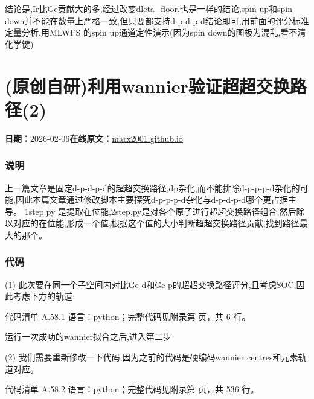 \documentclass[lang=cn,scheme=chinese,color=blue,device=normal,toc=onecol,math=cm]{elegantbook}
\begin{document}
结论是,Ir比Ge贡献大的多,经过改变dleta\_\allowbreak{}floor,也是一样的结论,spin up和spin down并不能在数量上严格一致,但只要都支持d-p-d-p-d结论即可,用前面的评分标准定量分析,用MLWFS 的spin up通道定性演示(因为spin down的图极为混乱,看不清化学键)\par



\section{(原创自研)利用wannier验证超超交换路径(2)}
\begin{articlemeta}
\textbf{日期：}2026-02-06\hfill\textbf{在线原文：}\href{https://marx2001.github.io/sci-note\_posts/20260206-super2}{marx2001.github.io}
\end{articlemeta}

\subsubsection{说明}


上一篇文章是固定d-p-d-p-d的超超交换路径,dp杂化,而不能排除d-p-p-p-d杂化的可能,因此本篇文章通过修改脚本主要探究d-p-p-p-d杂化与d-p-d-p-d哪个更占据主导。 1step.py 是提取在位能,2step.py是对各个原子进行超超交换路径组合,然后除以对应的在位能,形成一个值,根据这个值的大小判断超超交换路径贡献,找到路径最大的那个。\par


\subsubsection{代码}


(1) 此次要在同一个子空间内对比Ge-d和Ge-p的超超交换路径评分,且考虑SOC,因此考虑下方的轨道:\par


\begin{codeindexbox}{代码清单 A.58.1}
语言：python；完整代码见附录第 \pageref{code:58:1} 页，共 6 行。
\end{codeindexbox}


运行一次成功的wannier拟合之后,进入第二步\par


(2) 我们需要重新修改一下代码,因为之前的代码是硬编码wannier centres和元素轨道对应。\par


\begin{codeindexbox}{代码清单 A.58.2}
语言：python；完整代码见附录第 \pageref{code:58:2} 页，共 536 行。
\end{codeindexbox}
\end{document}
